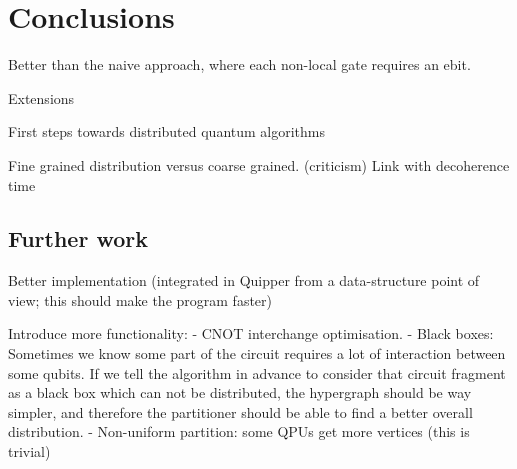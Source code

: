 \chapter{Conclusions}
\label{chap:Conclusions}

Better than the naive approach, where each non-local gate requires an ebit.

Extensions

First steps towards distributed quantum algorithms

Fine grained distribution versus coarse grained. (criticism) Link with decoherence time

\section{Further work}


Better implementation (integrated in Quipper from a data-structure point of view; this should make the program faster)

Introduce more functionality:
  - CNOT interchange optimisation.
  - Black boxes: Sometimes we know some part of the circuit requires a lot of interaction between some qubits. If we tell the algorithm in advance to consider that circuit fragment as a black box which can not be distributed, the hypergraph should be way simpler, and therefore the partitioner should be able to find a better overall distribution.
  - Non-uniform partition: some QPUs get more vertices (this is trivial)
